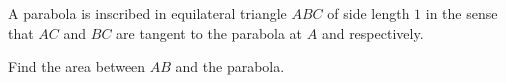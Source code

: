 A parabola is inscribed in equilateral triangle $ABC$ of side length $1$ in the sense that $AC$ and $BC$ are tangent to the parabola at $A$ and  respectively.

Find the area between $AB$ and the parabola.
